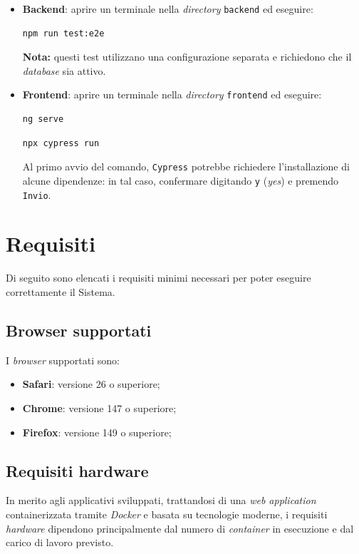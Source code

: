 \documentclass[10pt, letterpaper]{article}
\begin{document}
\begin{itemize}
      \item \textbf{Backend}: aprire un terminale nella \textit{directory} \texttt{backend} ed eseguire:
      \begin{verbatim}npm run test:e2e\end{verbatim}

      \textbf{Nota:} questi test utilizzano una configurazione separata e richiedono che il \textit{database} sia attivo.
      \item  \textbf{Frontend}: aprire un terminale nella \textit{directory} \texttt{frontend} ed eseguire:
      \begin{verbatim}ng serve\end{verbatim}
      \begin{verbatim}npx cypress run\end{verbatim}
      Al primo avvio del comando, \texttt{Cypress} potrebbe richiedere l'installazione di alcune dipendenze: in tal caso, confermare digitando \texttt{y} (\textit{yes}) e premendo \texttt{Invio}.
\end{itemize}

\section{Requisiti}
\label{sec:requisiti}

Di seguito sono elencati i requisiti minimi necessari per poter eseguire correttamente il Sistema.

\subsection{Browser supportati}
\label{sec:browsers}

I \textit{browser} supportati sono:

\begin{itemize}
    \item   \textbf{Safari}: versione 26 o superiore;
    \item   \textbf{Chrome}: versione 147 o superiore;
    \item   \textbf{Firefox}: versione 149 o superiore;
\end{itemize}

\subsection{Requisiti hardware}
In merito agli applicativi sviluppati, trattandosi di una \textit{web application} containerizzata tramite \textit{Docker} 
e basata su tecnologie moderne, i requisiti \textit{hardware} 
dipendono principalmente dal numero di \textit{container} in esecuzione e dal carico di lavoro previsto.
\end{document}
